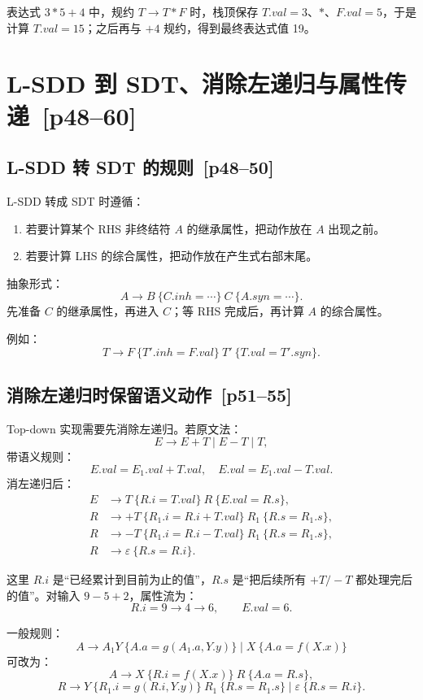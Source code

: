\documentclass[UTF8,fontset=none,11pt]{ctexart}
\newcommand{\pg}[1]{\texorpdfstring{{\small\color{graytext}\,[p#1]}}{ [p#1]}}
\newcommand{\eps}{\varepsilon}
\begin{document}
表达式 \(3*5+4\) 中，规约 \(T\to T*F\) 时，栈顶保存 \(T.val=3\)、\(*\)、\(F.val=5\)，于是计算 \(T.val=15\)；之后再与 \(+4\) 规约，得到最终表达式值 19。

\section{L-SDD 到 SDT、消除左递归与属性传递 \pg{48--60}}

\subsection{L-SDD 转 SDT 的规则 \pg{48--50}}

L-SDD 转成 SDT 时遵循：

\begin{enumerate}
  \item 若要计算某个 RHS 非终结符 \(A\) 的继承属性，把动作放在 \(A\) 出现之前。
  \item 若要计算 LHS 的综合属性，把动作放在产生式右部末尾。
\end{enumerate}

抽象形式：
\[
A\to B\ \{C.inh=\cdots\}\ C\ \{A.syn=\cdots\}.
\]
先准备 \(C\) 的继承属性，再进入 \(C\)；等 RHS 完成后，再计算 \(A\) 的综合属性。

例如：
\[
T\to F\ \{T'.inh=F.val\}\ T'\ \{T.val=T'.syn\}.
\]

\subsection{消除左递归时保留语义动作 \pg{51--55}}

Top-down 实现需要先消除左递归。若原文法：
\[
E\to E+T\mid E-T\mid T,
\]
带语义规则：
\[
E.val=E_1.val+T.val,\quad E.val=E_1.val-T.val.
\]
消左递归后：
\[
\begin{aligned}
E&\to T\ \{R.i=T.val\}\ R\ \{E.val=R.s\},\\
R&\to +T\ \{R_1.i=R.i+T.val\}\ R_1\ \{R.s=R_1.s\},\\
R&\to -T\ \{R_1.i=R.i-T.val\}\ R_1\ \{R.s=R_1.s\},\\
R&\to \eps\ \{R.s=R.i\}.
\end{aligned}
\]

这里 \(R.i\) 是“已经累计到目前为止的值”，\(R.s\) 是“把后续所有 \(+T/-T\) 都处理完后的值”。对输入 \(9-5+2\)，属性流为：
\[
R.i=9\to 4\to 6,\qquad E.val=6.
\]

一般规则：
\[
A\to A_1Y\ \{A.a=g(A_1.a,Y.y)\}\mid X\ \{A.a=f(X.x)\}
\]
可改为：
\[
A\to X\ \{R.i=f(X.x)\}\ R\ \{A.a=R.s\},
\]
\[
R\to Y\ \{R_1.i=g(R.i,Y.y)\}\ R_1\ \{R.s=R_1.s\}\mid \eps\ \{R.s=R.i\}.
\]
\end{document}

